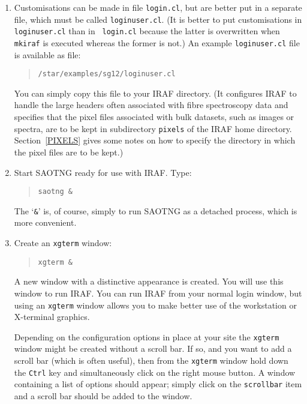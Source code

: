 \documentclass[twoside,11pt]{article}
\begin{document}
\begin{enumerate}
  \item Customisations can be made in file {\tt login.cl}, but are better
   put in a separate file, which must be called {\tt loginuser.cl}.  (It
   is better to put customisations in {\tt loginuser.cl} than in {\tt
   login.cl} because the latter is overwritten when {\tt mkiraf} is
   executed whereas the former is not.)  An example {\tt loginuser.cl}
   file is available as file:

  \begin{quote}
   {\tt /star/examples/sg12/loginuser.cl}
  \end{quote}

   You can simply copy this file to your IRAF directory.  (It configures
   IRAF to handle the large headers often associated with fibre spectroscopy
   data and specifies that the pixel files associated with bulk datasets,
   such as images or spectra,  are to be kept in subdirectory {\tt pixels}
   of the IRAF home directory.  Section~\ref{PIXELS} gives some notes on
   how to specify the directory in which the pixel files are to be kept.)

  \item Start SAOTNG ready for use with IRAF.  Type:

  \begin{quote}
   {\tt saotng \&}
  \end{quote}

   The `{\tt \&}' is, of course, simply to run SAOTNG as a detached
   process, which is more convenient.

  \item Create an {\tt xgterm} window:

  \begin{quote}
   {\tt xgterm \&}
  \end{quote}

   A new window with a distinctive appearance is created.  You will use
   this window to run IRAF.  You can run IRAF from your normal login
   window, but using an {\tt xgterm} window allows you to make better
   use of the workstation or X-terminal graphics.

   Depending on the configuration options in place at your site the
   {\tt xgterm} window might be created without a scroll bar.  If so,
   and you want to add a scroll bar (which is often useful), then from
   the {\tt xgterm} window hold down the {\tt Ctrl} key and simultaneously
   click on the right mouse button.  A window containing  a list of options
   should appear; simply click on the {\tt scrollbar} item and a scroll
   bar should be added to the window.


\end{enumerate}
\end{document}
